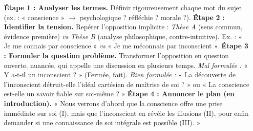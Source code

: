 \documentclass[11pt]{article}
\begin{document}
\begin{methode}
\textbf{Étape 1 : Analyser les termes.} Définir rigoureusement chaque mot du sujet (ex. : « conscience » $\to$ psychologique ? réfléchie ? morale ?).
\textbf{Étape 2 : Identifier la tension.} Repérer l'opposition implicite : \emph{Thèse A} (sens commun, évidence première) \emph{vs} \emph{Thèse B} (analyse philosophique, contre-intuitive). Ex. : « Je me connais par conscience » \emph{vs} « Je me méconnais par inconscient ».
\textbf{Étape 3 : Formuler la question problème.} Transformer l'opposition en question ouverte, nuancée, qui appelle une discussion en plusieurs temps. \emph{Mal formulée :} « Y a-t-il un inconscient ? » (Fermée, fait). \emph{Bien formulée :} « La découverte de l'inconscient détruit-elle l'idéal cartésien de maîtrise de soi ? » ou « La conscience est-elle un savoir fiable sur soi-même ? »
\textbf{Étape 4 : Annoncer le plan (en introduction).} « Nous verrons d'abord que la conscience offre une prise immédiate sur soi (I), mais que l'inconscient en révèle les illusions (II), pour enfin demander si une connaissance de soi intégrale est possible (III). »
\end{methode}
\end{document}

